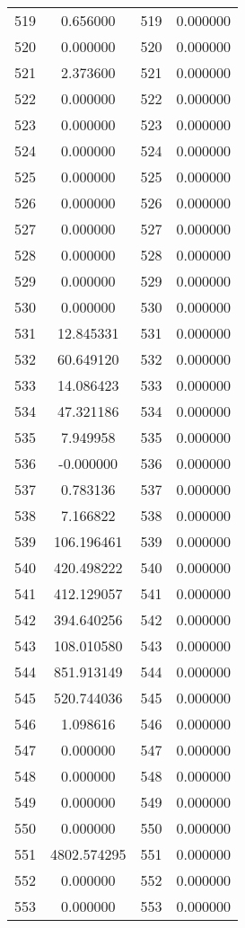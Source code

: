 \documentclass[12pt]{article}
\begin{document}
\begin{longtable}{@{}cccc@{}}
519 & 0.656000 & 519 & 0.000000 \\
520 & 0.000000 & 520 & 0.000000 \\
521 & 2.373600 & 521 & 0.000000 \\
522 & 0.000000 & 522 & 0.000000 \\
523 & 0.000000 & 523 & 0.000000 \\
524 & 0.000000 & 524 & 0.000000 \\
525 & 0.000000 & 525 & 0.000000 \\
526 & 0.000000 & 526 & 0.000000 \\
527 & 0.000000 & 527 & 0.000000 \\
528 & 0.000000 & 528 & 0.000000 \\
529 & 0.000000 & 529 & 0.000000 \\
530 & 0.000000 & 530 & 0.000000 \\
531 & 12.845331 & 531 & 0.000000 \\
532 & 60.649120 & 532 & 0.000000 \\
533 & 14.086423 & 533 & 0.000000 \\
534 & 47.321186 & 534 & 0.000000 \\
535 & 7.949958 & 535 & 0.000000 \\
536 & -0.000000 & 536 & 0.000000 \\
537 & 0.783136 & 537 & 0.000000 \\
538 & 7.166822 & 538 & 0.000000 \\
539 & 106.196461 & 539 & 0.000000 \\
540 & 420.498222 & 540 & 0.000000 \\
541 & 412.129057 & 541 & 0.000000 \\
542 & 394.640256 & 542 & 0.000000 \\
543 & 108.010580 & 543 & 0.000000 \\
544 & 851.913149 & 544 & 0.000000 \\
545 & 520.744036 & 545 & 0.000000 \\
546 & 1.098616 & 546 & 0.000000 \\
547 & 0.000000 & 547 & 0.000000 \\
548 & 0.000000 & 548 & 0.000000 \\
549 & 0.000000 & 549 & 0.000000 \\
550 & 0.000000 & 550 & 0.000000 \\
551 & 4802.574295 & 551 & 0.000000 \\
552 & 0.000000 & 552 & 0.000000 \\
553 & 0.000000 & 553 & 0.000000 \\

\end{longtable}
\end{document}
